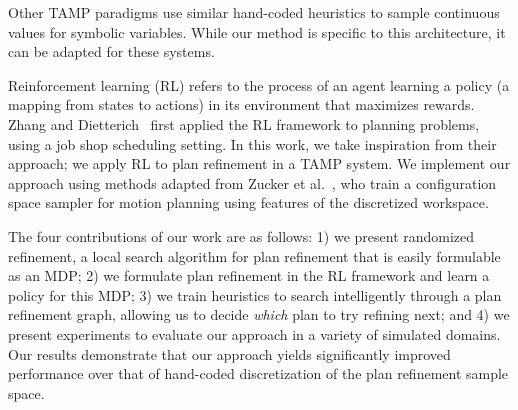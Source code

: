 Other TAMP paradigms use similar hand-coded heuristics to sample continuous values for symbolic variables.
While our method is specific to this architecture, it can be adapted for these systems.

Reinforcement learning (RL) refers to the process of an agent learning a policy (a mapping from states to actions)
in its environment that maximizes rewards. Zhang and Dietterich~\cite{JobShopSched} first applied the RL framework
to planning problems, using a job shop scheduling setting. In this work, we take inspiration from
their approach; we apply RL to plan refinement in a TAMP system. We implement our approach using methods adapted from
Zucker et al.~\cite{workspacebias}, who train a configuration space sampler for motion planning
using features of the discretized workspace.

The four contributions of our work are as follows: 1) we present randomized refinement, a local search
algorithm for plan refinement that is easily formulable as an MDP; 2) we formulate plan refinement in the
RL framework and learn a policy for this MDP; 3) we train heuristics to search intelligently
through a plan refinement graph, allowing us to decide \emph{which} plan to try refining next;
and 4) we present experiments to evaluate our approach in a variety of simulated
domains. Our results demonstrate that our approach yields significantly improved
performance over that of hand-coded discretization of the plan refinement sample space.
